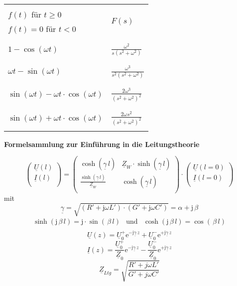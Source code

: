 \begin{tabularx}{\textwidth}{|p{11cm}|X|} 
	\hline
	&\\
	\(f(t)\) für \(t\ge 0\) & \multirow{2}{*}{\(F(s)\)} \\
	\(f(t)=0\) für \(t<0\) & \\
	&\\
	\hline
	\hline
	&\\
	\(1-\cos\left(\omega t\right)\) & \(\frac{\omega^2}{s\left(s^2+\omega^2\right)}\) \\
	&\\
	\hline
	&\\
	\(\omega t-\sin\left(\omega t\right)\) & \(\frac{\omega^3}{s^2\left(s^2+\omega^2\right)}\) \\
	&\\
	\hline
	&\\
	\(\sin\left(\omega t\right)-\omega t\cdot\cos\left(\omega t\right)\) & \(\frac{2\omega^3}{\left(s^2+\omega^2\right)^2}\) \\
	&\\
	\hline
	&\\
	\(\sin\left(\omega t\right)+\omega t\cdot\cos\left(\omega t\right)\) & \(\frac{2\omega s^2}{\left(s^2+\omega^2\right)^2}\) \\
	&\\
	\hline
\end{tabularx}

\vspace{2cm}
{\large\bf Formelsammlung zur Einführung in die Leitungstheorie}


\[
\begin{pmatrix}
	\underline U(l) \\
	\underline I(l) \\
\end{pmatrix}
=
\begin{pmatrix}
	\cosh(\underline \gamma \, l) & \underline Z_W \cdot \sinh(\underline \gamma \, l) \\
	\frac{\sinh(\underline \gamma \, l)}{\underline Z_W} & \cosh(\underline \gamma \, l) \\
\end{pmatrix}
\cdot
\begin{pmatrix}
	\underline U(l=0) \\
	\underline I(l=0) \\
\end{pmatrix}
\]
mit
\[\underline \gamma=\sqrt{(R' + \mathrm{j}\omega L')\cdot(G' + \mathrm{j}\omega C')}=\alpha+\mathrm{j} \, \beta\]
\begin{eqnarray*}
	\sinh(\mathrm{j} \, \beta \, l) = \mathrm{j} \cdot \sin( \, \beta \, l) & \mathrm{und} &\cosh(\mathrm{j} \, \beta \, l) =  \cos( \, \beta \, l) \\
\end{eqnarray*}
\[\underline U(z)= \underline U_0^+ \mathrm{e}^{- \mathrm{j} \underline \gamma \, z} + \underline U_0^- \mathrm{e}^{+ \mathrm{j}\underline \gamma \, z}\]
\[\underline I(z)=  \frac{\underline U_0^+}{ \underline Z_0} \mathrm{e}^{- \mathrm{j}\underline \gamma \, z} - \frac{\underline U_0^-}{ \underline Z_0} \mathrm{e}^{+ \mathrm{j}\underline \gamma \, z}\]
\[\underline Z_{Ltg}=\sqrt{\frac{R' + j\omega L'}{G' + j\omega C'}}\]
